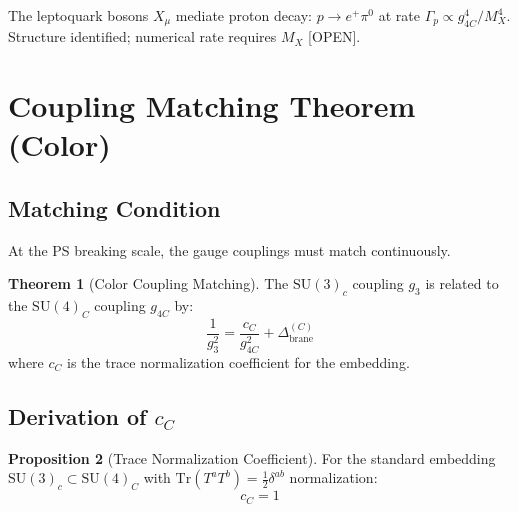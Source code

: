 \documentclass[11pt,a4paper]{article}
\theoremstyle{definition}
\newtheorem{theorem}{Theorem}[section]
\newtheorem{proposition}[theorem]{Proposition}
\begin{document}
\begin{trapbox}
The leptoquark bosons $X_{\mu}$ mediate proton decay:
$p \to e^+ \pi^0$ at rate $\Gamma_p \propto g_{4C}^4/M_X^4$.
Structure identified; numerical rate requires $M_X$ [OPEN].
\end{trapbox}

\newpage

\section{Coupling Matching Theorem (Color)}
\label{sec:coupling-matching}

\subsection{Matching Condition}
\label{subsec:matching-condition}

At the PS breaking scale, the gauge couplings must match continuously.

\begin{theorem}[Color Coupling Matching]
\label{thm:color-matching}
The $\text{SU}(3)_c$ coupling $g_3$ is related to the $\text{SU}(4)_C$ coupling $g_{4C}$ by:
\begin{equation}
  \label{eq:color-matching-raw}
  \frac{1}{g_3^2} = \frac{c_C}{g_{4C}^2} + \Delta_{\text{brane}}^{(C)}
\end{equation}
where $c_C$ is the trace normalization coefficient for the embedding.
\end{theorem}

\subsection{Derivation of $c_C$}
\label{subsec:derive-cc}

\begin{proposition}[Trace Normalization Coefficient]
\label{prop:cc-value}
For the standard embedding $\text{SU}(3)_c \subset \text{SU}(4)_C$ with
$\text{Tr}(T^a T^b) = \frac{1}{2}\delta^{ab}$ normalization:
\begin{equation}
  \label{eq:cc-value}
  \boxed{c_C = 1}
\end{equation}
\end{proposition}
\end{document}
